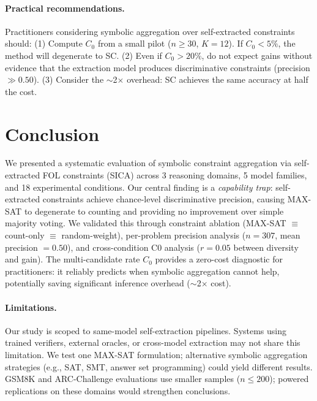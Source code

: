 \documentclass[11pt,a4paper]{article}
\begin{document}
\paragraph{Practical recommendations.}
Practitioners considering symbolic aggregation over self-extracted constraints should:
(1) Compute $C_0$ from a small pilot ($n \geq 30$, $K=12$). If $C_0 < 5\%$, the method will degenerate to SC.
(2) Even if $C_0 > 20\%$, do not expect gains without evidence that the extraction model produces discriminative constraints (precision $\gg 0.50$).
(3) Consider the $\sim$2$\times$ overhead: SC achieves the same accuracy at half the cost.

\section{Conclusion}
\label{sec:conclusion}

We presented a systematic evaluation of symbolic constraint aggregation via self-extracted FOL constraints (SICA) across 3 reasoning domains, 5 model families, and 18 experimental conditions.
Our central finding is a \emph{capability trap}: self-extracted constraints achieve chance-level discriminative precision, causing MAX-SAT to degenerate to counting and providing no improvement over simple majority voting.
We validated this through constraint ablation (MAX-SAT $\equiv$ count-only $\equiv$ random-weight), per-problem precision analysis ($n=307$, mean precision $= 0.50$), and cross-condition C0 analysis ($r = 0.05$ between diversity and gain).
The multi-candidate rate $C_0$ provides a zero-cost diagnostic for practitioners: it reliably predicts when symbolic aggregation cannot help, potentially saving significant inference overhead ($\sim$2$\times$ cost).

\paragraph{Limitations.}
Our study is scoped to same-model self-extraction pipelines. Systems using trained verifiers, external oracles, or cross-model extraction may not share this limitation.
We test one MAX-SAT formulation; alternative symbolic aggregation strategies (e.g., SAT, SMT, answer set programming) could yield different results.
GSM8K and ARC-Challenge evaluations use smaller samples ($n \leq 200$); powered replications on these domains would strengthen conclusions.
\end{document}
